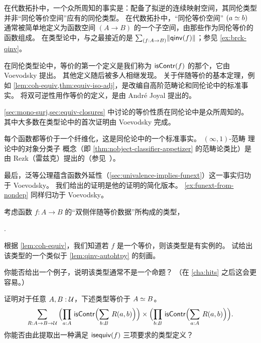 \sectionNotes

在代数拓扑中，一个众所周知的事实是：配备了拟逆的连续映射空间，其同伦类型并非``同伦等价空间''应有的同伦类型。
在代数拓扑中，``同伦等价空间'' $(a \simeq b)$ 通常被简单地定义为函数空间 $(A\to B)$ 的一个子空间，由那些作为同伦等价的函数组成。
在类型论中，与之最接近的是 $\sm{f:A\to B} \brck{\qinv(f)}$；参见 \cref{ex:brck-qinv}。

在同伦类型论中，等价的第一个定义是我们称为 $\mathsf{isContr}(f)$ 的那个，它由 Voevodsky 提出。
其他定义随后被多人相继发现。
关于伴随等价的基本定理，例如 \cref{lem:coh-equiv,thm:equiv-iso-adj}，是改编自高阶范畴论和同伦论中的标准事实。
将双可逆性用作等价的定义，是由 André Joyal 提出的。

\cref{sec:mono-surj,sec:equiv-closures} 中讨论的等价性质在同伦论中是众所周知的。
其中大多数在类型论中的首次证明由 Voevodsky 完成。

每个函数都等价于一个纤维化，这是同伦论中的一个标准事实。
$(\infty,1)$-范畴
%
理论中的对象分类子
%
%
概念（即 \cref{thm:nobject-classifier-appetizer} 的范畴论类比）是由 Rezk（雷兹克）提出的（参见~\cite{Rezk05,lurie:higher-topoi}）。

最后，泛等公理蕴含函数外延性（\cref{sec:univalence-implies-funext}）这一事实归功于 Voevodsky。
我们给出的证明是他的证明的简化版本。
\cref{ex:funext-from-nondep} 同样归功于 Voevodsky。

\sectionExercises

\begin{ex}\label{ex:two-sided-adjoint-equivalences}
  考虑函数 $f:A\to B$ 的``双侧伴随等价数据''所构成的类型，
  \begin{narrowmultline*}
    \narrowbreak
     \times
    .
  \end{narrowmultline*}
  根据 \cref{lem:coh-equiv}，我们知道若 $f$ 是一个等价，则该类型是有实例的。
  试给出该类型的一个类似于 \cref{lem:qinv-autohtpy} 的刻画。

  你能否给出一个例子，说明该类型通常不是一个命题？
  （在 \cref{cha:hits} 之后这会更容易。）
\end{ex}

\begin{ex}\label{ex:symmetric-equiv}
  证明对于任意 $A,B:\mathcal{U}$，下述类型等价于 $A \simeq B$。
  \begin{equation*}
    \sm{R:A\to B\to \type}
    \Parens{\prd{a:A} \iscontr\Parens{\sm{b:B} R(a,b)}} \times
    \Parens{\prd{b:B} \iscontr\Parens{\sm{a:A} R(a,b)}}.
  \end{equation*}
  你能否由此提取出一种满足 $\mathsf{isequiv}(f)$ 三项要求的类型定义？
\end{ex}

